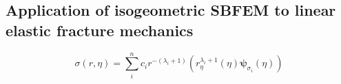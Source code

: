 \subsection{Application of isogeometric SBFEM to linear elastic fracture mechanics}

    \begin{equation}
        \sigma(r,\eta) = \sum_i^n
            c_i r^{-(\lambda_i+1)} \left(
                r_\eta^{\lambda_i+1} (\eta)
                \boldsymbol{\psi}_{\sigma_i}(\eta)
            \right)
        \label{eq:isosbfem_fracture_stress_field}
    \end{equation}

\pagebreak